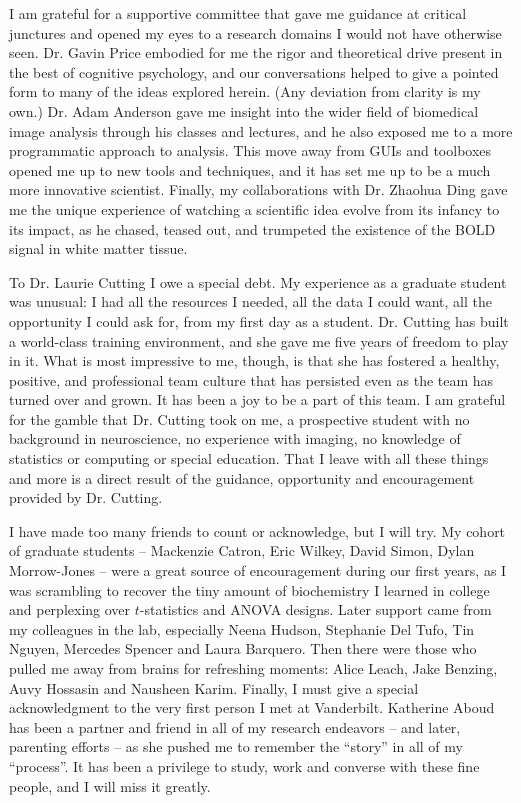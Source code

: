 \documentclass[12pt]{report}  %
\begin{document}
I am grateful for a supportive committee that gave me guidance at critical junctures and opened my eyes to a research domains I would not have otherwise seen. Dr. Gavin Price embodied for me the rigor and theoretical drive present in the best of cognitive psychology, and our conversations helped to give a pointed form to many of the ideas explored herein. (Any deviation from clarity is my own.) Dr. Adam Anderson gave me insight into the wider field of biomedical image analysis through his classes and lectures, and he also exposed me to a more programmatic approach to analysis. This move away from GUIs and toolboxes opened me up to new tools and techniques, and it has set me up to be a much more innovative scientist. Finally, my collaborations with Dr. Zhaohua Ding gave me the unique experience of watching a scientific idea evolve from its infancy to its impact, as he chased, teased out, and trumpeted the existence of the BOLD signal in white matter tissue.

To Dr. Laurie Cutting I owe a special debt. My experience as a graduate student was unusual: I had all the resources I needed, all the data I could want, all the opportunity I could ask for, from my first day as a student. Dr. Cutting has built a world-class training environment, and she gave me five years of freedom to play in it. What is most impressive to me, though, is that she has fostered a healthy, positive, and professional team culture that has persisted even as the team has turned over and grown. It has been a joy to be a part of this team. I am grateful for the gamble that Dr. Cutting took on me, a prospective student with no background in neuroscience, no experience with imaging, no knowledge of statistics or computing or special education. That I leave with all these things and more is a direct result of the guidance, opportunity and encouragement provided by Dr. Cutting.

I have made too many friends to count or acknowledge, but I will try. My cohort of graduate students -- Mackenzie Catron, Eric Wilkey, David Simon, Dylan Morrow-Jones -- were a great source of encouragement during our first years, as I was scrambling to recover the tiny amount of biochemistry I learned in college and perplexing over $t$-statistics and ANOVA designs. Later support came from my colleagues in the lab, especially Neena Hudson, Stephanie Del Tufo, Tin Nguyen, Mercedes Spencer and Laura Barquero. Then there were those who pulled me away from brains for refreshing moments: Alice Leach, Jake Benzing, Auvy Hossasin and Nausheen Karim. Finally, I must give a special acknowledgment to the very first person I met at Vanderbilt. Katherine Aboud has been a partner and friend in all of my research endeavors -- and later, parenting efforts -- as she pushed me to remember the ``story'' in all of my ``process''. It has been a privilege to study, work and converse with these fine people, and I will miss it greatly. 
\end{document}
